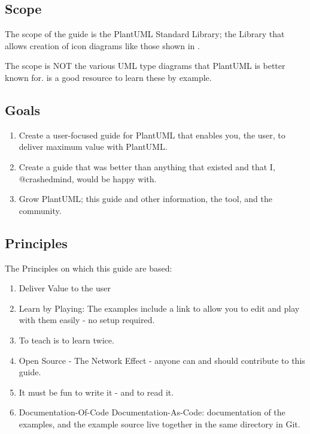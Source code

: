\documentclass[letterpaper,10pt,english]{sphinxmanual}
\begin{document}
\subsection{Scope}
\label{\detokenize{about/AboutThisGuide:scope}}
The scope of the guide is the PlantUML Standard Library; the Library
that allows creation of icon diagrams like those shown in {\hyperref[\detokenize{index:plantuml-diagram-examples}]{}} .

The scope is NOT the various UML type diagrams that PlantUML is better known for.
 is a good resource to learn these by example.


\subsection{Goals}
\label{\detokenize{about/AboutThisGuide:goals}}\begin{enumerate}
%
\item {} 
Create a user-focused guide for PlantUML that enables you, the user, to deliver maximum value with PlantUML.

\item {} 
Create a guide that was better than anything that existed and that I, @crashedmind, would be happy with.

\item {} 
Grow PlantUML; this guide and other information, the tool, and the community.

\end{enumerate}


\subsection{Principles}
\label{\detokenize{about/AboutThisGuide:principles}}
The Principles on which this guide are based:
\begin{enumerate}
%
\item {} 
Deliver Value to the user

\item {} 
Learn by Playing: The examples include a link to allow you to edit and play with them easily - no setup required.

\item {} 
To teach is to learn twice.

\item {} 
Open Source - The Network Effect - anyone can and should contribute to this guide.

\item {} 
It must be fun to write it - and to read it.

\item {} 
Documentation-Of-Code Documentation-As-Code: documentation of the examples, and the example source live together in the same directory in Git.

\end{enumerate}
\end{document}
